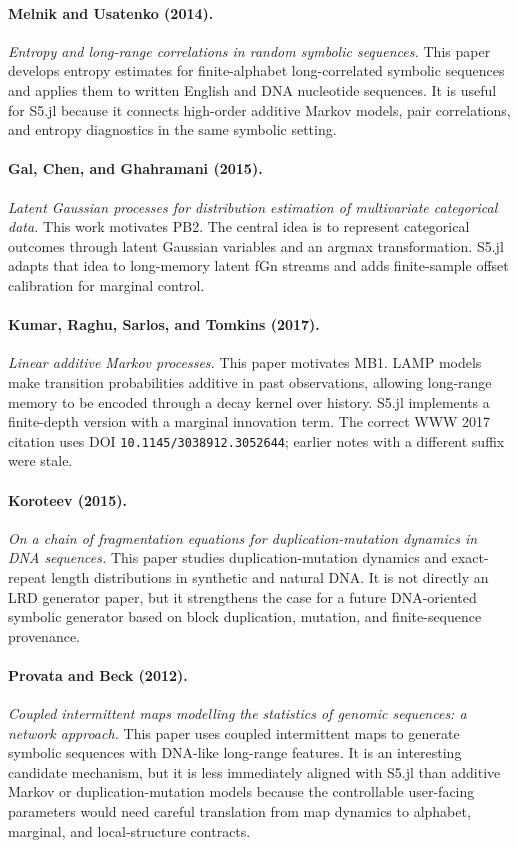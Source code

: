 \documentclass[11pt]{article}
\begin{document}
\paragraph{Melnik and Usatenko (2014).}
\emph{Entropy and long-range correlations in random symbolic sequences.}
This paper develops entropy estimates for finite-alphabet long-correlated
symbolic sequences and applies them to written English and DNA nucleotide
sequences. It is useful for S5.jl because it connects high-order additive Markov
models, pair correlations, and entropy diagnostics in the same symbolic setting.

\paragraph{Gal, Chen, and Ghahramani (2015).}
\emph{Latent Gaussian processes for distribution estimation of multivariate
categorical data.}
This work motivates PB2. The central idea is to represent categorical outcomes
through latent Gaussian variables and an argmax transformation. S5.jl adapts that
idea to long-memory latent fGn streams and adds finite-sample offset calibration
for marginal control.

\paragraph{Kumar, Raghu, Sarlos, and Tomkins (2017).}
\emph{Linear additive Markov processes.}
This paper motivates MB1. LAMP models make transition probabilities additive in
past observations, allowing long-range memory to be encoded through a decay
kernel over history. S5.jl implements a finite-depth version with a marginal
innovation term. The correct WWW 2017 citation uses DOI
\texttt{10.1145/3038912.3052644}; earlier notes with a different suffix were
stale.

\paragraph{Koroteev (2015).}
\emph{On a chain of fragmentation equations for duplication-mutation dynamics in
DNA sequences.}
This paper studies duplication-mutation dynamics and exact-repeat length
distributions in synthetic and natural DNA. It is not directly an LRD generator
paper, but it strengthens the case for a future DNA-oriented symbolic generator
based on block duplication, mutation, and finite-sequence provenance.

\paragraph{Provata and Beck (2012).}
\emph{Coupled intermittent maps modelling the statistics of genomic sequences: a
network approach.}
This paper uses coupled intermittent maps to generate symbolic sequences with
DNA-like long-range features. It is an interesting candidate mechanism, but it is
less immediately aligned with S5.jl than additive Markov or duplication-mutation
models because the controllable user-facing parameters would need careful
translation from map dynamics to alphabet, marginal, and local-structure
contracts.
\end{document}
